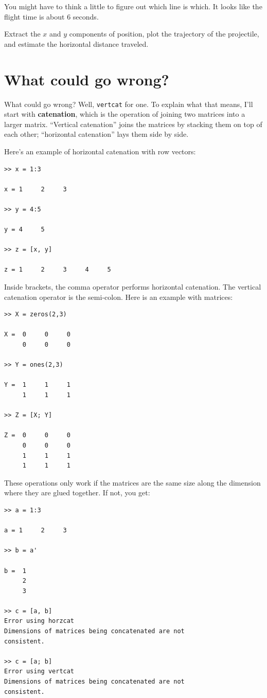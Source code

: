 \documentclass{book}
\begin{document}
You might have to think a little to figure out which line is
which.  It looks like the flight time is about 6 seconds.

\begin{ex}
Extract the $x$ and $y$ components of
position, plot the trajectory of the projectile, and estimate the
horizontal distance traveled.
\end{ex}


\section{What could go wrong?}

What could go wrong?  Well, {\tt vertcat} for one.  To explain
what that means, I'll start with {\bf catenation}, which is
the operation of joining two matrices into a larger matrix.
``Vertical catenation'' joins the matrices by stacking them on
top of each other; ``horizontal catenation'' lays them
side by side.

Here's an example of horizontal catenation with row vectors:

\begin{verbatim}
>> x = 1:3

x = 1     2     3

>> y = 4:5

y = 4     5

>> z = [x, y]

z = 1     2     3     4     5
\end{verbatim}

Inside brackets, the comma operator performs horizontal catenation.
The vertical catenation operator is the semi-colon.  Here is an
example with matrices:

\begin{verbatim}
>> X = zeros(2,3)

X =  0     0     0
     0     0     0

>> Y = ones(2,3)

Y =  1     1     1
     1     1     1

>> Z = [X; Y]

Z =  0     0     0
     0     0     0
     1     1     1
     1     1     1
\end{verbatim}

These operations only work if the matrices are the same size along
the dimension where they are glued together.  If not, you get:

\begin{verbatim}
>> a = 1:3

a = 1     2     3

>> b = a'

b =  1
     2
     3

>> c = [a, b]
Error using horzcat
Dimensions of matrices being concatenated are not
consistent.

>> c = [a; b]
Error using vertcat
Dimensions of matrices being concatenated are not
consistent.
\end{verbatim}
\end{document}
